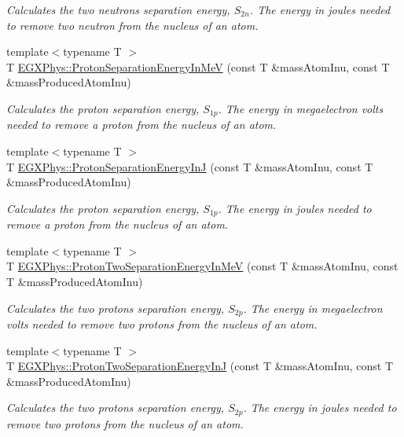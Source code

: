 \begin{DoxyCompactItemize}
\begin{DoxyCompactList}\small\item\em Calculates the two neutrons separation energy, $S_{2n}$. The energy in joules needed to remove two neutron from the nucleus of an atom. \end{DoxyCompactList}\item 
{\footnotesize template$<$typename T $>$ }\\T \mbox{\hyperlink{group___e_g_x_phys-_nuclear_separation_energy_ga6a619ded55c47ed22ea2d8a85202ebeb}{E\+G\+X\+Phys\+::\+Proton\+Separation\+Energy\+In\+MeV}} (const T \&mass\+Atom\+Inu, const T \&mass\+Produced\+Atom\+Inu)
\begin{DoxyCompactList}\small\item\em Calculates the proton separation energy, $S_{1p}$. The energy in megaelectron volts needed to remove a proton from the nucleus of an atom. \end{DoxyCompactList}\item 
{\footnotesize template$<$typename T $>$ }\\T \mbox{\hyperlink{group___e_g_x_phys-_nuclear_separation_energy_ga4274d8f5a3860169fd81970707eb582a}{E\+G\+X\+Phys\+::\+Proton\+Separation\+Energy\+InJ}} (const T \&mass\+Atom\+Inu, const T \&mass\+Produced\+Atom\+Inu)
\begin{DoxyCompactList}\small\item\em Calculates the proton separation energy, $S_{1p}$. The energy in joules needed to remove a proton from the nucleus of an atom. \end{DoxyCompactList}\item 
{\footnotesize template$<$typename T $>$ }\\T \mbox{\hyperlink{group___e_g_x_phys-_nuclear_separation_energy_ga0de42783a7c650eb32f85dc2d40d84d7}{E\+G\+X\+Phys\+::\+Proton\+Two\+Separation\+Energy\+In\+MeV}} (const T \&mass\+Atom\+Inu, const T \&mass\+Produced\+Atom\+Inu)
\begin{DoxyCompactList}\small\item\em Calculates the two protons separation energy, $S_{2p}$. The energy in megaelectron volts needed to remove two protons from the nucleus of an atom. \end{DoxyCompactList}\item 
{\footnotesize template$<$typename T $>$ }\\T \mbox{\hyperlink{group___e_g_x_phys-_nuclear_separation_energy_gad7c1d4a32daa8aaa53c5fce37c421f82}{E\+G\+X\+Phys\+::\+Proton\+Two\+Separation\+Energy\+InJ}} (const T \&mass\+Atom\+Inu, const T \&mass\+Produced\+Atom\+Inu)
\begin{DoxyCompactList}\small\item\em Calculates the two protons separation energy, $S_{2p}$. The energy in joules needed to remove two protons from the nucleus of an atom. \end{DoxyCompactList}\end{DoxyCompactItemize}


